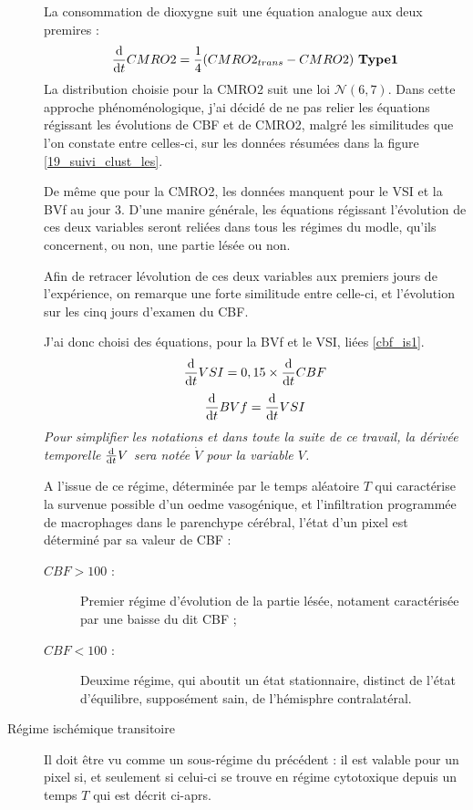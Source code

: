 \begin{description}
\par
La consommation de dioxygne suit une \'equation analogue aux deux premires :
\begin{equation}
\frac{\text{d}}{\text{d}t}CMRO2=\frac{1}{4}(CMRO2_{trans}-CMRO2) \ \mathbf{Type 1}
\end{equation}
La distribution choisie pour la CMRO2 suit une loi $\mathcal{N}(6,7)$. %
Dans cette approche ph\'enom\'enologique, j'ai d\'ecid\'e de ne pas relier les \'equations r\'egissant les \'evolutions de CBF et de CMRO2, %
malgr\'e les similitudes que l'on constate entre celles-ci, sur les donn\'ees r\'esum\'ees dans la figure \ref{19_suivi_clust_les}. %

De m\^eme que pour la CMRO2, les donn\'ees manquent pour le VSI et la BVf au jour 3. %
D'une manire g\'en\'erale, les \'equations r\'egissant l'\'evolution de ces deux variables seront reli\'ees dans tous les r\'egimes du modle, %
qu'ils concernent, ou non, une partie l\'es\'ee ou non.

\par
Afin de retracer l\'evolution de ces deux variables aux premiers jours de l'exp\'erience, %
on remarque une forte similitude entre celle-ci, et l'\'evolution sur les cinq jours d'examen du CBF.

\par
J'ai donc choisi des \'equations, pour la BVf et le VSI, li\'ees  \ref{cbf_is1}.
\begin{equation}
\frac{\text{d}}{\text{d}t}VSI=0,15\times\frac{\text{d}}{\text{d}t}CBF
\label{vsi_is}
\end{equation}
\begin{equation}
\frac{\text{d}}{\text{d}t}BVf=\frac{\text{d}}{\text{d}t}VSI
\label{bvf_is}
\end{equation}
\emph{Pour simplifier les notations et dans toute la suite de ce travail, la d\'eriv\'ee temporelle $\frac{\text{d}}{\text{d}t}V$ sera not\'ee $\dot{V}$ pour la variable $V$.}
\par
A l'issue de ce r\'egime, d\'etermin\'ee par le temps al\'eatoire $T$ qui caract\'erise la survenue possible d'un oedme vasog\'enique, %
et l'infiltration programm\'ee de macrophages dans le parenchype c\'er\'ebral, l'\'etat d'un pixel est d\'etermin\'e par sa valeur de CBF :
\begin{description}
\item[$CBF > 100$ :] Premier r\'egime d'\'evolution de la partie l\'es\'ee, notament caract\'eris\'ee par une baisse du dit CBF ;
\item[$CBF < 100$ :] Deuxime r\'egime, qui aboutit  un \'etat stationnaire, distinct de l'\'etat d'\'equilibre, suppos\'ement sain, de l'h\'emisphre contralat\'eral.
\end{description}
\item[R\'egime isch\'emique transitoire] Il doit \^etre vu comme un sous-r\'egime du pr\'ec\'edent : %
il est valable pour un pixel si, et seulement si celui-ci se trouve en r\'egime cytotoxique depuis un temps $T$ qui est d\'ecrit ci-aprs.


\end{description}
